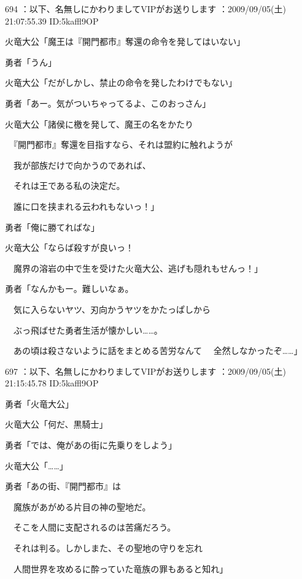 \documentclass[a4j,twocolumn]{tarticle}
\begin{document}
	
    
    

694 ：以下、名無しにかわりましてVIPがお送りします ：2009/09/05(土) 21:07:55.39 ID:5kaffl9OP 


火竜大公「魔王は『開門都市』奪還の命令を発してはいない」\par{} 
勇者「うん」 



火竜大公「だがしかし、禁止の命令を発したわけでもない」\par{} 
勇者「あー。気がついちゃってるよ、このおっさん」 



火竜大公「諸侯に檄を発して、魔王の名をかたり \par{}
　『開門都市』奪還を目指すなら、それは盟約に触れようが\par{} 
　我が部族だけで向かうのであれば、\par{} 
　それは王である私の決定だ。\par{} 
　誰に口を挟まれる云われもないっ！」 



勇者「俺に勝てればな」 



火竜大公「ならば殺すが良いっ！\par{} 
　魔界の溶岩の中で生を受けた火竜大公、逃げも隠れもせんっ！」 



勇者「なんかもー。難しいなぁ。\par{} 
　気に入らないヤツ、刃向かうヤツをかたっぱしから\par{} 
　ぶっ飛ばせた勇者生活が懐かしい……。\par{} 
　あの頃は殺さないように話をまとめる苦労なんて 
　全然しなかったぞ……」 

	
    
    

697 ：以下、名無しにかわりましてVIPがお送りします ：2009/09/05(土) 21:15:45.78 ID:5kaffl9OP 


勇者「火竜大公」\par{} 
火竜大公「何だ、黒騎士」 



勇者「では、俺があの街に先乗りをしよう」\par{} 
火竜大公「……」 



勇者「あの街、『開門都市』は\par{} 
　魔族があがめる片目の神の聖地だ。\par{} 
　そこを人間に支配されるのは苦痛だろう。\par{} 
　それは判る。しかしまた、その聖地の守りを忘れ\par{} 
　人間世界を攻めるに酔っていた竜族の罪もあると知れ」 
\end{document}
